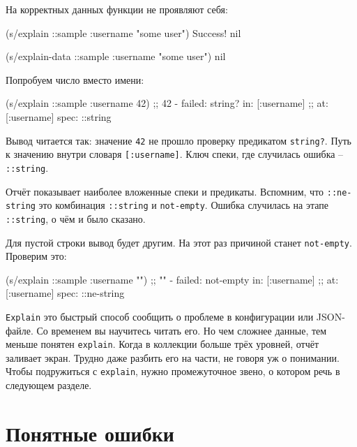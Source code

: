 \noindent
На корректных данных функции не проявляют себя:

\begin{english}
  \begin{clojure}
(s/explain ::sample {:username "some user"})
Success!
nil

(s/explain-data ::sample {:username "some user"})
nil
  \end{clojure}
\end{english}

\noindent
Попробуем число вместо имени:

\begin{english}
  \begin{clojure}
(s/explain ::sample {:username 42})
;; 42 - failed: string? in: [:username]
;; at: [:username] spec: ::string
  \end{clojure}
\end{english}

Вывод читается так: значение \verb|42| не прошло проверку предикатом
\verb|string?|. Путь к значению внутри словаря \verb|[:username]|. Ключ
спеки, где случилась ошибка -- \verb|::string|.

Отчёт показывает наиболее вложенные спеки и предикаты. Вспомним, что
\verb|::ne-string| это комбинация \verb|::string| и
\verb|not-empty|. Ошибка случилась на этапе \verb|::string|, о чём и было
сказано.

Для пустой строки вывод будет другим. На этот раз причиной станет
\verb|not-empty|. Проверим это:

\begin{english}
  \begin{clojure}
(s/explain ::sample {:username ""})
;; "" - failed: not-empty in: [:username]
;; at: [:username] spec: ::ne-string
  \end{clojure}
\end{english}

\verb|Explain| это быстрый способ сообщить о проблеме в конфигурации или
JSON-файле. Со временем вы научитесь читать его. Но чем сложнее данные, тем
меньше понятен \verb|explain|. Когда в коллекции больше трёх уровней,
отчёт заливает экран. Трудно даже разбить его на части, не говоря уж о
понимании. Чтобы подружиться с \verb|explain|, нужно промежуточное звено, о
котором речь в следующем разделе.

\section{Понятные ошибки}


